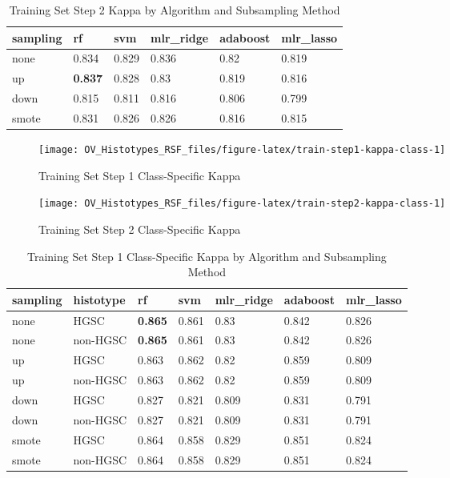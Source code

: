\documentclass[
]{report}
\begin{document}
\begin{table}

\caption{\label{tab:train-step2-kappa-table}Training Set Step 2 Kappa by Algorithm and Subsampling Method}
\centering
\begin{tabular}[t]{l|l|l|l|l|l}
\hline
sampling & rf & svm & mlr\_ridge & adaboost & mlr\_lasso\\
\hline
none & 0.834 & 0.829 & 0.836 & 0.82 & 0.819\\
\hline
up & \textbf{0.837} & 0.828 & 0.83 & 0.819 & 0.816\\
\hline
down & 0.815 & 0.811 & 0.816 & 0.806 & 0.799\\
\hline
smote & 0.831 & 0.826 & 0.826 & 0.816 & 0.815\\
\hline
\end{tabular}
\end{table}

\begin{figure}[H]

{\centering \texttt{[image: OV\_Histotypes\_RSF\_files/figure-latex/train-step1-kappa-class-1]} 

}

\caption{Training Set Step 1 Class-Specific Kappa}\label{fig:train-step1-kappa-class}
\end{figure}

\begin{figure}[H]

{\centering \texttt{[image: OV\_Histotypes\_RSF\_files/figure-latex/train-step2-kappa-class-1]} 

}

\caption{Training Set Step 2 Class-Specific Kappa}\label{fig:train-step2-kappa-class}
\end{figure}

\begin{table}

\caption{\label{tab:train-step1-kappa-class-table}Training Set Step 1 Class-Specific Kappa by Algorithm and Subsampling Method}
\centering
\begin{tabular}[t]{l|l|l|l|l|l|l}
\hline
sampling & histotype & rf & svm & mlr\_ridge & adaboost & mlr\_lasso\\
\hline
none & HGSC & \textbf{0.865} & 0.861 & 0.83 & 0.842 & 0.826\\
\hline
none & non-HGSC & \textbf{0.865} & 0.861 & 0.83 & 0.842 & 0.826\\
\hline
up & HGSC & 0.863 & 0.862 & 0.82 & 0.859 & 0.809\\
\hline
up & non-HGSC & 0.863 & 0.862 & 0.82 & 0.859 & 0.809\\
\hline
down & HGSC & 0.827 & 0.821 & 0.809 & 0.831 & 0.791\\
\hline
down & non-HGSC & 0.827 & 0.821 & 0.809 & 0.831 & 0.791\\
\hline
smote & HGSC & 0.864 & 0.858 & 0.829 & 0.851 & 0.824\\
\hline
smote & non-HGSC & 0.864 & 0.858 & 0.829 & 0.851 & 0.824\\
\hline
\end{tabular}
\end{table}
\end{document}
